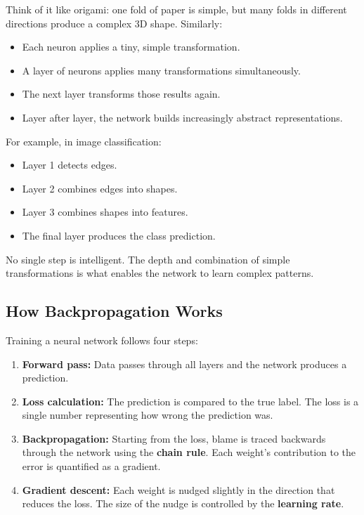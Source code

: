 \documentclass[12pt,a4paper]{article}
\begin{document}
Think of it like origami: one fold of paper is simple, but many folds in different
directions produce a complex 3D shape. Similarly:

\begin{itemize}
    \item Each neuron applies a tiny, simple transformation.
    \item A layer of neurons applies many transformations simultaneously.
    \item The next layer transforms those results again.
    \item Layer after layer, the network builds increasingly abstract representations.
\end{itemize}

For example, in image classification:
\begin{itemize}
    \item Layer 1 detects edges.
    \item Layer 2 combines edges into shapes.
    \item Layer 3 combines shapes into features.
    \item The final layer produces the class prediction.
\end{itemize}

No single step is intelligent. The depth and combination of simple transformations is
what enables the network to learn complex patterns.

\subsection{How Backpropagation Works}

Training a neural network follows four steps:

\begin{enumerate}
    \item \textbf{Forward pass:} Data passes through all layers and the network produces
          a prediction.
    \item \textbf{Loss calculation:} The prediction is compared to the true label. The
          loss is a single number representing how wrong the prediction was.
    \item \textbf{Backpropagation:} Starting from the loss, blame is traced backwards
          through the network using the \textbf{chain rule}. Each weight's contribution
          to the error is quantified as a gradient.
    \item \textbf{Gradient descent:} Each weight is nudged slightly in the direction that
          reduces the loss. The size of the nudge is controlled by the \textbf{learning
          rate}.
\end{enumerate}
\end{document}
